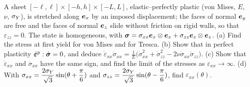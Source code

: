 \label{exo:pl-sheet}
%
A sheet $[-\ell,\ell]\times[-h,h]\times[-L,L]$, elastic--perfectly plastic
(von Mises, $E$, $\nu$, $\sigma_{Y}$), is stretched along $\bm{e}_x$ by an imposed
displacement; the faces of normal $\bm{e}_y$ are free and the faces of normal
$\bm{e}_z$ slide without friction on rigid walls, so that $\varepsilon_{zz}=0$.
The state is homogeneous, with
$\bm{\sigma}=\sigma_{xx}\bm{e}_x\otimes\bm{e}_x+\sigma_{zz}\bm{e}_z\otimes\bm{e}_z$.
(a) Find the stress at first yield for von Mises and for Tresca.
(b) Show that in perfect plasticity $\dot{\bm{\varepsilon}}^p:\dot{\bm{\sigma}}=0$, and deduce
$\displaystyle \dot\varepsilon_{xx}\dot\sigma_{xx}=\frac1E\bigl(\dot\sigma_{xx}^2+\dot\sigma_{zz}^2-2\nu\dot\sigma_{xx}\dot\sigma_{zz}\bigr)$.
(c) Show that $\dot\varepsilon_{xx}$ and $\dot\sigma_{xx}$ have the same sign, and find
the limit of the stresses as $\varepsilon_{xx}\to\infty$.
(d) With $\displaystyle \sigma_{xx}=\frac{2\sigma_{Y}}{\sqrt3}\sin(\theta+\frac\pi6)$ and
$\displaystyle \sigma_{zz}=\frac{2\sigma_{Y}}{\sqrt3}\sin(\theta-\frac\pi6)$, find $\varepsilon_{xx}(\theta)$.
